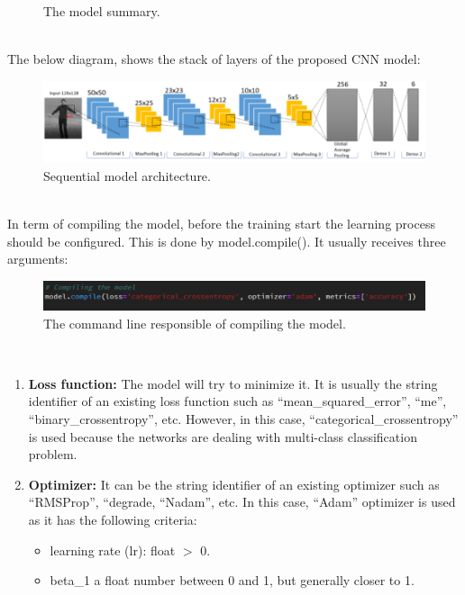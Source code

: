 \begin{itemize}
\begin{itemize}
\begin{figure}[ht]
    \decoRule
    \caption[The model summary.]{The model summary.}
    \label{fig:la}
    \end{figure}\hfill \\
    The below diagram, shows the stack of layers of the proposed CNN model:
    \begin{figure}[ht]
    \centering
    \includegraphics{Figures/cnnmm}
    \decoRule
    \caption[Sequential model architecture.]{Sequential model architecture.}
    \label{fig:la}
    \end{figure}\hfill \\
In term of compiling the model, before the training start the learning process should be configured. This is done by model.compile(). It usually receives three arguments:
\end{itemize}
 \begin{figure}[ht]
    \centering
    \includegraphics{Figures/compill}
    \decoRule
    \caption[The command line responsible of compiling the model.]{The command line responsible of compiling the model.}
    \label{fig:la}
    \end{figure}\hfill \\
    \begin{enumerate}
        \item \textbf{Loss function:} The model will try to minimize it. It is usually the string identifier of an existing loss function such as “mean\_squared\_error”, “me”, “binary\_crossentropy”, etc. However, in this case, “categorical\_crossentropy” is used because the networks are dealing with multi-class classification problem.
        \item \textbf{Optimizer:} It can be the string identifier of an existing optimizer such as “RMSProp”, “degrade, “Nadam”, etc. In this case, “Adam” optimizer is used as it has the following criteria:
        \begin{itemize}
            \item learning rate (lr): float $>$ 0.
            \item beta\_1 a float number between 0 and 1, but generally closer to 1.

\end{itemize}
\end{enumerate}
\end{itemize}
